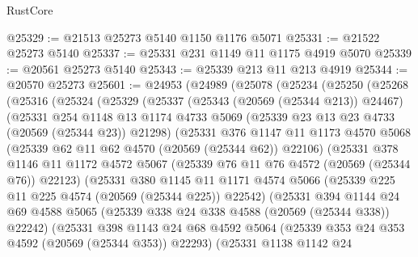\begin{lexlean}{RustCore}
\begin{coremodule}
@25329 := @21513 @25273 @5140 @1150 @1176 @5071
@25331 := @21522 @25273 @5140
@25337 := @25331 @231 @1149 @11 @1175 @4919 @5070
@25339 := @20561 @25273 @5140
@25343 := @25339 @213 @11 @213 @4919
@25344 := @20570 @25273
@25601 := @24953
    (@24989
      (@25078
        (@25234
          (@25250
            (@25268
              (@25316
                (@25324
                  (@25329
                    (@25337
                      (@25343 (@20569 (@25344 @213)) @24467)
                      (@25331
                        @254
                        @1148
                        @13
                        @1174
                        @4733
                        @5069
                        (@25339 @23 @13 @23 @4733 (@20569 (@25344 @23)) @21298)
                        (@25331
                          @376
                          @1147
                          @11
                          @1173
                          @4570
                          @5068
                          (@25339 @62 @11 @62 @4570 (@20569 (@25344 @62)) @22106)
                          (@25331
                            @378
                            @1146
                            @11
                            @1172
                            @4572
                            @5067
                            (@25339 @76 @11 @76 @4572 (@20569 (@25344 @76)) @22123)
                            (@25331
                              @380
                              @1145
                              @11
                              @1171
                              @4574
                              @5066
                              (@25339 @225 @11 @225 @4574 (@20569 (@25344 @225)) @22542)
                              (@25331
                                @394
                                @1144
                                @24
                                @69
                                @4588
                                @5065
                                (@25339 @338 @24 @338 @4588 (@20569 (@25344 @338)) @22242)
                                (@25331
                                  @398
                                  @1143
                                  @24
                                  @68
                                  @4592
                                  @5064
                                  (@25339 @353 @24 @353 @4592 (@20569 (@25344 @353)) @22293)
                                  (@25331
                                    @1138
                                    @1142
                                    @24

\end{coremodule}
\end{lexlean}
